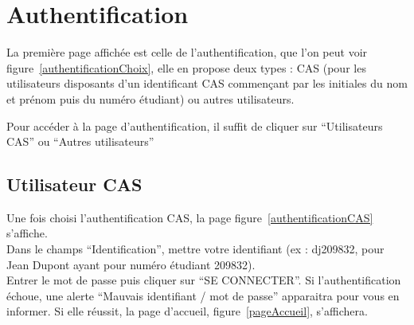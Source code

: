 \documentclass[a4paper,11pt,final]{report}
\begin{document}
\section{Authentification}
La première page affichée est celle de l'authentification, que l'on peut voir figure~\ref{authentificationChoix}, elle en propose deux types : CAS (pour les utilisateurs disposants d'un identificant CAS commençant par les initiales du nom et prénom puis du numéro étudiant) ou autres utilisateurs.\\
\noindent\begin{minipage}{\linewidth}%
\label{authentificationChoix}
\end{minipage}

Pour accéder à la page d'authentification, il suffit de cliquer sur ``Utilisateurs CAS'' ou ``Autres utilisateurs''
\subsection{Utilisateur CAS}
Une fois choisi l'authentification CAS, la page figure~\ref{authentificationCAS} s'affiche.\\
Dans le champs ``Identification'', mettre votre identifiant (ex : dj209832, pour Jean Dupont ayant pour numéro étudiant 209832).\\
Entrer le mot de passe puis cliquer sur ``SE CONNECTER''. Si l'authentification échoue, une alerte ``Mauvais identifiant / mot de passe'' apparaitra pour vous en informer. Si elle réussit, la page d'accueil, figure~\ref{pageAccueil}, s'affichera. 
\end{document}
